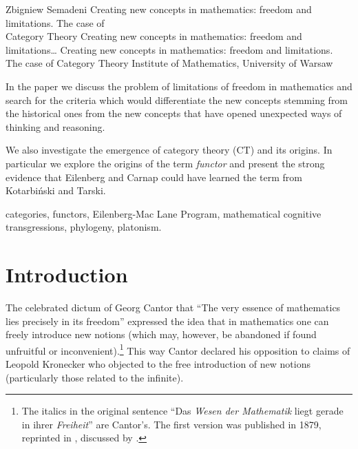 \begin{artengenv}{Zbigniew Semadeni}
	{Creating new concepts in mathematics: 
	  freedom and limitations.
	  The case of\\Category Theory}
	{Creating new concepts in mathematics: 
		  freedom and limitations\ldots}
	{Creating new concepts in mathematics: 
		  freedom and limitations.\\
		  The case of Category Theory}
	{Institute of Mathematics, 
	  University of Warsaw}
	{In the paper we discuss the problem of limitations of freedom in mathematics and search
	for the criteria which would differentiate the new concepts stemming from the historical ones
	from the new concepts that have opened unexpected ways of thinking and reasoning.  \par
	We also investigate the emergence of category theory (CT) and its origins.
	In particular we explore the origins of the term \textit{functor} and present the
	strong evidence that Eilenberg and Carnap could have learned the term from Kotarbi{\'n}ski 
		and Tarski.}
	{categories, functors, Eilenberg-Mac Lane Program, mathematical 
	cognitive transgressions, phylogeny, platonism.}








\section{Introduction}
\lettrine[loversize=0.13,lines=2,lraise=-0.03,nindent=0em,findent=0.2pt]%
{T}{}he celebrated dictum of Georg Cantor that ``The very essence of mathematics lies 
precisely in its freedom'' expressed the idea that in mathematics one can freely 
introduce new notions (which may, however, be abandoned if found unfruitful or 
inconvenient).\footnote{The italics in the original sentence ``Das \textit{Wesen 
der Mathematik} liegt gerade in ihrer \textit{Freiheit}'' are Cantor's. 
The first version was published in 1879, reprinted in \parencite[p.34]{Cantor}, discussed 
by \citeauthor{Ferreiros} \parencite*[p.257]{Ferreiros}. } %
This way Cantor declared his opposition to claims of Leopold Kronecker who objected 
to the free introduction of new notions (particularly those related to the infinite). 


\end{artengenv}
